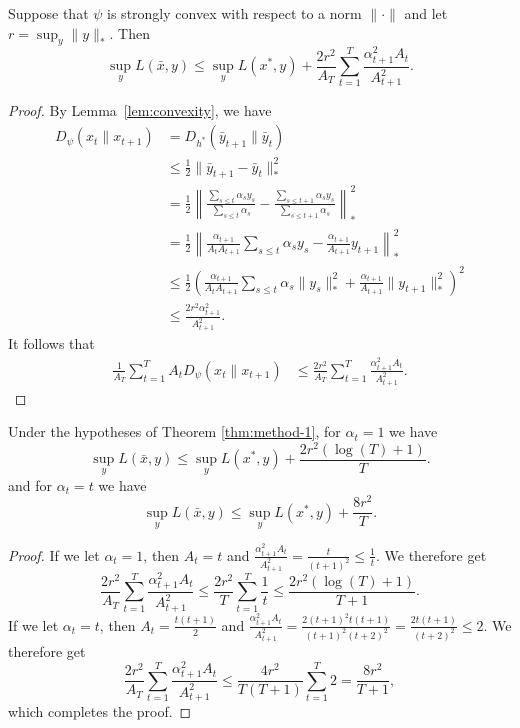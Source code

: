 \documentclass[paper.tex]{subfiles}
\begin{document}
\begin{theorem}
\label{thm:method-1}
Suppose that $\psi$ is strongly convex with respect to a norm $\|\cdot\|$ 
and let $r = \sup_{y} \|y\|_{*}$. Then 
\[ \sup_{y} L(\bar{x}, y) \leq \sup_{y} L(x^*, y) + \frac{2r^2}{A_T} \sum_{t=1}^T \frac{\alpha_{t+1}^2A_t}{A_{t+1}^2}. \]
\end{theorem}
\begin{proof}
By Lemma~\ref{lem:convexity}, we have 
\begin{align*}
D_\psi(x_t \| x_{t+1}) &= D_{h^*}(\bar{y}_{t+1} \| \bar{y}_{t}) \\
 &\leq \frac{1}{2}\|\bar y_{t+1}-\bar y_{t}\|_{*}^2 \\
 &= \frac{1}{2}\left\|\frac{\sum_{s \leq t}\alpha_sy_s}{\sum_{s \leq t} \alpha_s} - \frac{\sum_{s \leq t+1}\alpha_sy_s}{\sum_{s \leq t+1} \alpha_s}\right\|_{*}^2 \\
 &= \frac{1}{2}\left\|\frac{\alpha_{t+1}}{A_tA_{t+1}} \sum_{s \leq t} \alpha_sy_s - \frac{\alpha_{t+1}}{A_{t+1}} y_{t+1}\right\|_{*}^2 \\
 &\leq \frac{1}{2} \left(\frac{\alpha_{t+1}}{A_tA_{t+1}} \sum_{s \leq t} \alpha_s\|y_s\|_{*}^2 + \frac{\alpha_{t+1}}{A_{t+1}} \|y_{t+1}\|_{*}^2\right)^2 \\
 &\leq \frac{2r^2\alpha_{t+1}^2}{A_{t+1}^2}.
\end{align*}
It follows that 
\begin{align*}
\frac{1}{A_T} \sum_{t=1}^T A_tD_\psi(x_t \| x_{t+1}) &\leq \frac{2r^2}{A_T} \sum_{t=1}^T \frac{\alpha_{t+1}^2A_t}{A_{t+1}^2}.
\end{align*}
\end{proof}

\begin{corollary} 
\label{cor:method-1}
Under the hypotheses of Theorem \ref{thm:method-1}, for $\alpha_{t} = 1$ we have
\[ \sup_{y} L(\bar{x}, y) \leq \sup_{y} L(x^*, y) + \frac{2r^2 (\log (T) + 1)}{T}. \]
and for $\alpha_t = t$ we have
\[ \sup_{y} L(\bar{x}, y) \leq \sup_{y} L(x^*, y) + \frac{8r^2}{T}. \]
\end{corollary}
\begin{proof}
If we let $\alpha_t = 1$, then $A_t = t$ and $\frac{\alpha_{t+1}^2A_t}{A_{t+1}^2} = \frac{t}{(t+1)^{2}} \le \frac{1}{t}$.
We therefore get
\begin{equation}
\frac{2r^2}{A_T} \sum_{t=1}^T \frac{\alpha_{t+1}^2A_t}{A_{t+1}^2} \leq \frac{2r^2}{T} \sum_{t=1}^{T}\frac{1}{t} \leq \frac{2r^2(\log (T) + 1)}{T+1}.
\end{equation}
If we let $\alpha_t = t$, then $A_t = \frac{t(t+1)}{2}$ and 
$\frac{\alpha_{t+1}^2A_t}{A_{t+1}^2} = \frac{2(t+1)^2t(t+1)}{(t+1)^2(t+2)^2} = \frac{2t(t+1)}{(t+2)^2} \leq 2$.
We therefore get
\begin{equation}
\frac{2r^2}{A_T} \sum_{t=1}^T \frac{\alpha_{t+1}^2A_t}{A_{t+1}^2} \leq \frac{4r^2}{T(T+1)} \sum_{t=1}^{T}2 = \frac{8r^2}{T+1},
\end{equation}
which completes the proof.
\end{proof}
\end{document}
